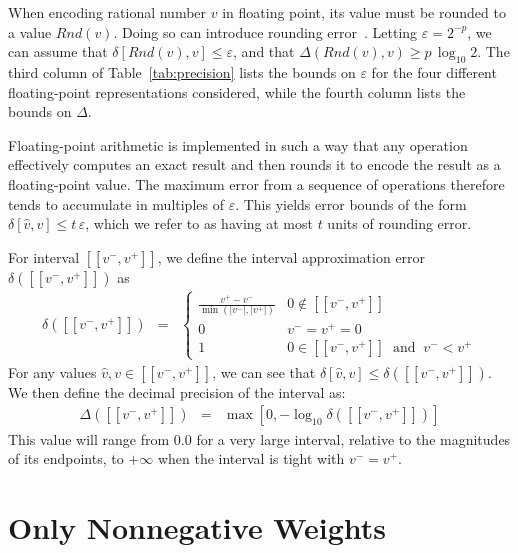 \documentclass{easychair}
\newcommand{\approximate}[1]{\hat{#1}}
\newcommand{\approxv}{\approximate{v}}
\newcommand{\round}{\mathit{Rnd}}
\newcommand{\aerror}{\delta}
\newcommand{\digitprecision}{\Delta}
\newcommand{\roundepsilon}{\varepsilon}
\newcommand{\vmin}{v^{-}}
\newcommand{\vmax}{v^{+}}
\newcommand{\interval}[1]{[\![#1]\!]}
\begin{document}
When encoding rational number $v$ in floating point, its value must be
rounded to a value $\round(v)$.  Doing so can introduce rounding
error~\cite{knuth:fp:1981,muller:hfpa:2018}.  Letting $\roundepsilon =
2^{-p}$, we can assume that $\aerror[\round(v), v] \leq
\roundepsilon$, and that $\digitprecision(\round(v), v) \geq p \,
\log_{10} 2$.
The third column of
Table~\ref{tab:precision} lists the bounds on $\roundepsilon$ for the
four different floating-point representations considered, while the fourth column lists the bounds on $\digitprecision$.

Floating-point arithmetic is implemented in such a way that any
operation effectively computes an exact result and then rounds it to
encode the result as a floating-point value.  The maximum error from a sequence of operations
therefore tends to accumulate in multiples of $\roundepsilon$.
This yields error bounds of the form $\aerror[\approxv, v] \leq t\,\roundepsilon$,
which we  refer to as having at most $t$ units of
rounding error.

For interval $\interval{\vmin, \vmax}$, we define the interval approximation error $\aerror(\interval{\vmin, \vmax})$ as
\begin{eqnarray}
\aerror(\interval{\vmin, \vmax}) & = & \left\{ \begin{array}{ll}
  \frac{\vmax - \vmin}{\min(|\vmin|, |\vmax|)}  & 0 \not \in \interval{\vmin, \vmax}\\[0.8em]
  0 & \vmin = \vmax = 0 \\
  1 & 0 \in \interval{\vmin, \vmax} \;\; \textrm{and} \;\; \vmin < \vmax
  \end{array} \right. \label{eqn:interval:error}
\end{eqnarray}
For any values $\approxv, v \in \interval{\vmin, \vmax}$, we can see that
$\aerror[\approxv, v] \leq \aerror(\interval{\vmin, \vmax})$.
We then define the decimal precision of the interval as:
\begin{eqnarray}
\digitprecision(\interval{\vmin, \vmax}) & = & \max[0, -\log_{10} \aerror(\interval{\vmin, \vmax})] \label{eqn:interval:digitprecision} 
\end{eqnarray}
This value will range from $0.0$ for a very large interval, relative to the magnitudes of its endpoints, to $+\infty$ when the interval is tight with $\vmin = \vmax$.

\section{Only Nonnegative Weights}
\label{sect:nonneg}
\end{document}
